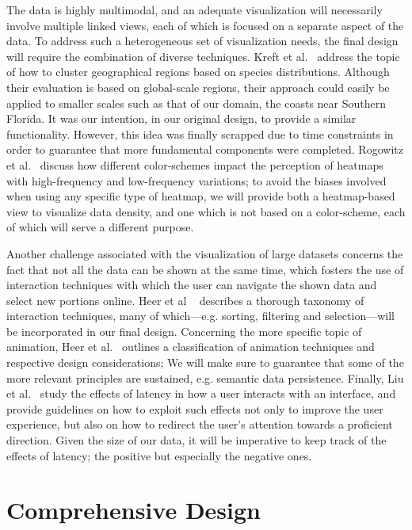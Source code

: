 \documentclass[letterpaper]{article} %
\begin{document}
The data is highly multimodal, and an adequate visualization will necessarily
involve multiple linked views, each of which is focused on a separate aspect of
the data.  To address such a heterogeneous set of visualization needs, the
final design will require the combination of diverse techniques.  Kreft et
al.~\cite{kreft2010framework} address the topic of how to cluster geographical
regions based on species distributions.  Although their evaluation is based on
global-scale regions, their approach could easily be applied to smaller scales
such as that of our domain, the coasts near Southern Florida.  It was our
intention, in our original design, to provide a similar functionality.
However, this idea was finally scrapped due to time constraints in order to
guarantee that more fundamental components were completed.  Rogowitz et
al.~\cite{rogowitz1996not} discuss how different color-schemes impact the
perception of heatmaps with high-frequency and low-frequency variations;  to
avoid the biases involved when using any specific type of heatmap, we will
provide both a heatmap-based view to visualize data density, and one which is
not based on a color-scheme, each of which will serve a different purpose.

Another challenge associated with the visualization of large datasets concerns
the fact that not all the data can be shown at the same time, which fosters the
use of interaction techniques with which the user can navigate the shown data
and select new portions online.  Heer et al ~\cite{heer2012interactive}
describes a thorough taxonomy of interaction techniques, many of which---e.g.
sorting, filtering and selection---will be incorporated in our final design.
Concerning the more specific topic of animation, Heer et
al.~\cite{heer2007animated} outlines a classification of animation techniques
and respective design considerations; We will make sure to guarantee that some
of the more relevant principles are sustained, e.g.  semantic data persistence.
Finally, Liu et al.~\cite{liu2014effects} study the effects of latency in how
a user interacts with an interface, and provide guidelines on how to exploit
such effects not only to improve the user experience, but also on how to
redirect the user's attention towards a proficient direction.  Given the size
of our data, it will be imperative to keep track of the effects of latency; the
positive but especially the negative ones.

\section{Comprehensive Design}
\end{document}
